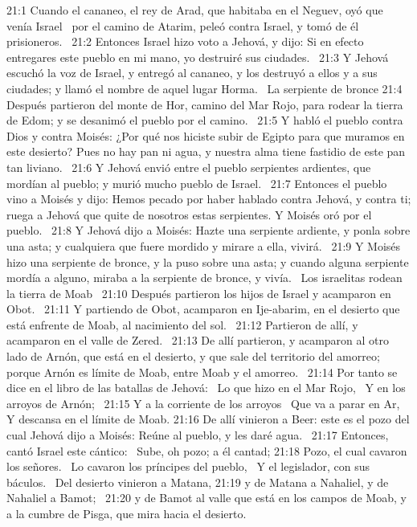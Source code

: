 21:1 Cuando el cananeo, el rey de Arad, que habitaba en el Neguev, oyó que venía Israel  por el camino de Atarim, peleó contra Israel, y tomó de él prisioneros.  
21:2 Entonces Israel hizo voto a Jehová, y dijo: Si en efecto entregares este pueblo en mi mano, yo destruiré sus ciudades.  
21:3 Y Jehová escuchó la voz de Israel, y entregó al cananeo, y los destruyó a ellos y a sus ciudades; y llamó el nombre de aquel lugar Horma.  
La serpiente de bronce 
21:4 Después partieron del monte de Hor, camino del Mar Rojo, para rodear la tierra de Edom; y se desanimó el pueblo por el camino.  
21:5 Y habló el pueblo contra Dios y contra Moisés: ¿Por qué nos hiciste subir de Egipto para que muramos en este desierto? Pues no hay pan ni agua, y nuestra alma tiene fastidio de este pan tan liviano.  
21:6 Y Jehová envió entre el pueblo serpientes ardientes, que mordían al pueblo; y murió mucho pueblo de Israel.  
21:7 Entonces el pueblo vino a Moisés y dijo: Hemos pecado por haber hablado contra Jehová, y contra ti; ruega a Jehová que quite de nosotros estas serpientes. Y Moisés oró por el pueblo.  
21:8 Y Jehová dijo a Moisés: Hazte una serpiente ardiente, y ponla sobre una asta; y cualquiera que fuere mordido y mirare a ella, vivirá.  
21:9 Y Moisés hizo una serpiente de bronce, y la puso sobre una asta; y cuando alguna serpiente mordía a alguno, miraba a la serpiente de bronce, y vivía.  
Los israelitas rodean la tierra de Moab  
21:10 Después partieron los hijos de Israel y acamparon en Obot.  
21:11 Y partiendo de Obot, acamparon en Ije-abarim, en el desierto que está enfrente de Moab, al nacimiento del sol.  
21:12 Partieron de allí, y acamparon en el valle de Zered.  
21:13 De allí partieron, y acamparon al otro lado de Arnón, que está en el desierto, y que sale del territorio del amorreo; porque Arnón es límite de Moab, entre Moab y el amorreo.  
21:14 Por tanto se dice en el libro de las batallas de Jehová:  
Lo que hizo en el Mar Rojo,  
Y en los arroyos de Arnón;  
21:15 Y a la corriente de los arroyos  
Que va a parar en Ar,  
Y descansa en el límite de Moab. 
21:16 De allí vinieron a Beer: este es el pozo del cual Jehová dijo a Moisés: Reúne al pueblo, y les daré agua.  
21:17 Entonces, cantó Israel este cántico:  
Sube, oh pozo; a él cantad; 
21:18 Pozo, el cual cavaron los señores.  
Lo cavaron los príncipes del pueblo,  
Y el legislador, con sus báculos.  
Del desierto vinieron a Matana, 
21:19 y de Matana a Nahaliel, y de Nahaliel a Bamot;  
21:20 y de Bamot al valle que está en los campos de Moab, y a la cumbre de Pisga, que mira hacia el desierto.  
